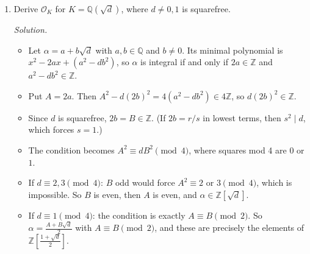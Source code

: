 \documentclass[11pt]{article}
\newcommand{\Z}{\mathbb{Z}}
\newcommand{\Q}{\mathbb{Q}}
\newcommand{\OK}{\mathcal{O}_K}
\begin{document}
\begin{enumerate}[label=\textbf{Q1.\arabic*}]
  \textit{Solution.}
  \begin{enumerate}[label=(\alph*)]
    \item Not Dedekind: it is not integrally closed. The element $\omega=\frac{1+\sqrt{-3}}2$ satisfies $\omega^2-\omega+1=0$ and lies in $\Q(\sqrt{-3})$, but $\omega\notin\Z[\sqrt{-3}]$.
    \item Not Dedekind: $(0)\subsetneq(x)\subsetneq(2,x)$ is a chain of primes, so $(x)$ is a nonzero prime that is not maximal. (The ring is Noetherian and integrally closed, since it is a UFD.)
    \item Dedekind: $-3\equiv1\pmod4$, so this ring is the full ring of integers of $\Q(\sqrt{-3})$.
    \item Not Dedekind: it is not Noetherian. The chain $(2)\subsetneq(2^{1/2})\subsetneq(2^{1/4})\subsetneq\cdots$ never stabilizes.
    \begin{itemize}
      \item Each inclusion holds because $2^{1/2^k}=\bigl(2^{1/2^{k+1}}\bigr)^2$.
      \item Each inclusion is strict because $2^{1/2^{k+1}}$ is not a unit: its inverse has minimal polynomial $x^{2^{k+1}}-\tfrac12\notin\Z[x]$, so the inverse is not integral.
    \end{itemize}
    Note that $\overline{\Z}$ is integrally closed and every nonzero prime is maximal. Only the Noetherian axiom fails.
  \end{enumerate}

  \item Derive $\OK$ for $K=\Q(\sqrt d)$, where $d\ne 0,1$ is squarefree.

  \textit{Solution.}
  \begin{itemize}
    \item Let $\alpha=a+b\sqrt d$ with $a,b\in\Q$ and $b\neq0$. Its minimal polynomial is $x^2-2ax+(a^2-db^2)$, so $\alpha$ is integral if and only if $2a\in\Z$ and $a^2-db^2\in\Z$.
    \item Put $A=2a$. Then $A^2-d(2b)^2=4(a^2-db^2)\in4\Z$, so $d(2b)^2\in\Z$.
    \item Since $d$ is squarefree, $2b=B\in\Z$. (If $2b=r/s$ in lowest terms, then $s^2\mid d$, which forces $s=1$.)
    \item The condition becomes $A^2\equiv dB^2\pmod 4$, where squares mod 4 are $0$ or $1$.
    \item If $d\equiv2,3\pmod4$: $B$ odd would force $A^2\equiv2$ or $3\pmod4$, which is impossible. So $B$ is even, then $A$ is even, and $\alpha\in\Z[\sqrt d]$.
    \item If $d\equiv1\pmod4$: the condition is exactly $A\equiv B\pmod2$. So $\alpha=\frac{A+B\sqrt d}{2}$ with $A\equiv B\pmod 2$, and these are precisely the elements of $\Z\!\left[\frac{1+\sqrt d}{2}\right]$.
  \end{itemize}
\end{enumerate}
\end{document}
